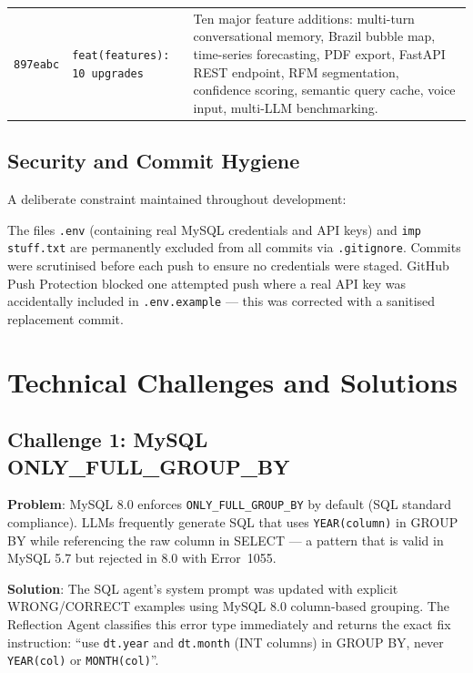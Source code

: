 \documentclass[12pt,a4paper]{report}
\newenvironment{infobox}[1]{%
  \begin{tcolorbox}[enhanced,breakable,
    colback=AccentBlue!8,colframe=AccentBlue!50,
    title={\faInfoCircle\quad#1},
    fonttitle=\bfseries\small\color{AccentBlue},
    coltitle=AccentBlue,
    boxrule=0.6pt,arc=4pt]
}{\end{tcolorbox}}
\begin{document}
\begin{longtable}{lp{2.8cm}p{8cm}}
  \texttt{897eabc} &
  \texttt{feat(features): 10 upgrades} &
  Ten major feature additions: multi-turn conversational memory, Brazil bubble map, time-series
  forecasting, PDF export, FastAPI REST endpoint, RFM segmentation, confidence scoring, semantic
  query cache, voice input, multi-LLM benchmarking. \\

\end{longtable}

\section{Security and Commit Hygiene}

A deliberate constraint maintained throughout development:
\begin{infobox}{Security Constraint (Permanent)}
  The files \texttt{.env} (containing real MySQL credentials and API keys) and
  \texttt{imp stuff.txt} are permanently excluded from all commits via \texttt{.gitignore}.
  Commits were scrutinised before each push to ensure no credentials were staged.
  GitHub Push Protection blocked one attempted push where a real API key was accidentally
  included in \texttt{.env.example} — this was corrected with a sanitised replacement commit.
\end{infobox}

\chapter{Technical Challenges and Solutions}
\label{ch:challenges}

\section{Challenge 1: MySQL ONLY\_FULL\_GROUP\_BY}

\textbf{Problem}: MySQL 8.0 enforces \texttt{ONLY\_FULL\_GROUP\_BY} by default (SQL standard
compliance). LLMs frequently generate SQL that uses \texttt{YEAR(column)} in GROUP BY while
referencing the raw column in SELECT — a pattern that is valid in MySQL 5.7 but rejected
in 8.0 with Error~1055.

\textbf{Solution}: The SQL agent's system prompt was updated with explicit WRONG/CORRECT
examples using MySQL 8.0 column-based grouping. The Reflection Agent classifies this error
type immediately and returns the exact fix instruction: ``use \texttt{dt.year} and
\texttt{dt.month} (INT columns) in GROUP BY, never \texttt{YEAR(col)} or \texttt{MONTH(col)}''.
\end{document}
